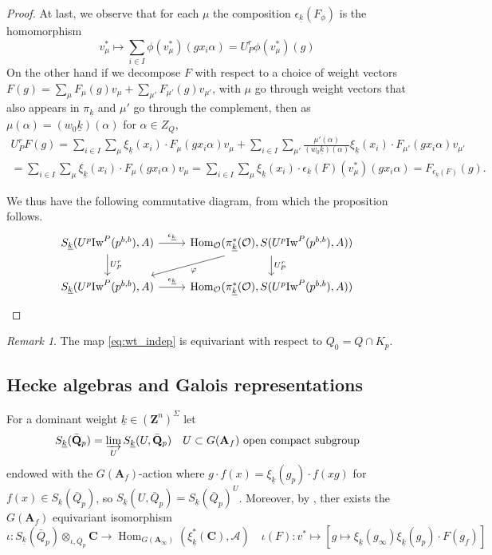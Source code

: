\documentclass[leqno]{amsart}
\newcommand{\wt}[1]{\underline{ #1 }}
\newcommand{\Iw}{\textnormal{Iw}}
\newcommand{\Q}{{\mathbf{Q}}}
\newcommand{\Z}{{\mathbf{Z}}}
\newcommand{\C}{\mathbf C}
\newcommand{\A}{\mathbf A}
\newcommand{\oo}{\mathcal{O}} %
\DeclareMathOperator{\Hom}{Hom}
\theoremstyle{definition}
\theoremstyle{remark}
\newtheorem{rem}[thm]{Remark}
\begin{document}
\begin{proof}
	At last, we observe that for each $\mu$ the composition
	$\epsilon_{\wt{k}}(F_\phi)$ is the homomorphism
	\[
		v_\mu^*\mapsto \sum_{i\in I}\phi(v_\mu^*)(gx_i\alpha)
		=U_P^r\phi(v_\mu^*)(g)
	\]
	On the other hand 
	if we decompose $F$ with respect to a choice of weight vectors
	$F(g)=\sum_\mu F_\mu(g)v_\mu+\sum_{\mu'}F_{\mu'}(g)v_{\mu'}$, 
	with $\mu$ go through weight vectors that also appears in $\pi_{\wt{k}}$
	and $\mu'$ go through the complement,
	then as $\mu(\alpha)=(w_0\wt{k})(\alpha)$ for $\alpha\in Z_Q$,
	\begin{multline*}
	U_P^rF(g)=
	\sum_{i\in I}
	\sum_\mu \xi_{\wt{k}}(x_i)\cdot F_\mu(gx_i\alpha)v_\mu+
	\sum_{i\in I}
	\sum_{\mu'}\frac{\mu'(\alpha)}{(w_0\wt{k})(\alpha)}
	\xi_{\wt{k}}(x_i)\cdot F_{\mu'}(gx_i\alpha)v_{\mu'}\\=
	\sum_{i\in I}
	\sum_\mu \xi_{\wt{k}}(x_i)\cdot F_\mu(gx_i\alpha)v_\mu=
	\sum_{i\in I}
	\sum_\mu \xi_{\wt{k}}(x_i)\cdot\epsilon_{\wt{k}}(F)(v^*_\mu)(gx_i\alpha)
	=F_{\epsilon_{\wt{k}}(F)}(g).
	\end{multline*}

	We thus have the following commutative diagram,
	from which the proposition follows.
	\[
	\begin{tikzcd}
		S_{\wt{k}}(U^p\Iw^P(p^{b,b}),A)
		\arrow[r,"\epsilon_{\wt{k}}"]
		\arrow[d,"U_P^r"]
		& \Hom_\oo(\pi^*_{\wt{k}}(\oo), S(U^p\Iw^P(p^{b,b}),A))
		\arrow[d,"U_P^r"]
		\arrow[dl,"\varphi"]\\
		S_{\wt{k}}(U^p\Iw^P(p^{b,b}),A)
		\arrow[r,"\epsilon_{\wt{k}}"]
		& \Hom_\oo(\pi^*_{\wt{k}}(\oo), S(U^p\Iw^P(p^{b,b}),A))
	\end{tikzcd}	
	\]
\end{proof}

\begin{rem}
	The map \eqref{eq:wt_indep} is equivariant 
	with respect to $Q_0=Q\cap K_p$. 
\end{rem}

\subsection{Hecke algebras and Galois representations}

For a dominant weight $\wt{k}\in (\Z^n)^{\Sigma}$ let
\[
	S_{\wt{k}}(\bar{\Q}_p)=\varinjlim_{U}
	S_{\wt{k}}(U,\bar{\Q}_p)\quad
	U\subset G(\A_f) \text{ open compact subgroup}
\]
endowed with the $G(\A_f)$-action
where $g\cdot f(x)=\xi_{\wt{k}}(g_p)\cdot f(xg)$ for
$f(x)\in S_{\wt{k}}(\bar{Q}_p)$,
so $S_{\wt{k}}(U,\bar{Q}_p)=S_{\wt{k}}(\bar{Q}_p)^U$.
Moreover, by \cite[Prop 3.3.2]{CHT}, 
ther exists the $G(\A_f)$ equivariant isomorphism
\[
	\iota\colon S_{\wt{k}}(\bar{Q}_p)\otimes_{\iota,\bar{Q}_p}\C
	\rightarrow \Hom_{G(\A_\infty)} (\xi_{\wt{k}}^*(\C), \mathcal{A})\quad
	\iota(F)\colon v^*\mapsto 
	[g\mapsto \xi_{\wt{k}}(g_\infty)\xi_{\wt{k}}(g_p)\cdot F(g_f)]
\]
\end{document}

